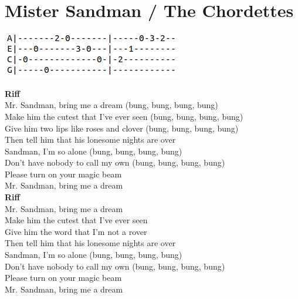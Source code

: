 \section{Mister Sandman / The Chordettes}\label{sec:mistersandman}
\includegraphics{songs/m/mistersandmantab.png}

\CmajorSeven
\Bseven
\Eseven
\Aseven
\Dseven
\Gseven
\Aminor
\Dminor
\Fminor

\textbf{Riff}\\
Mr. Sandman, bring me a dream (bung, bung, bung, bung)\\
Make him the cutest that  I've ever seen (bung, bung, bung, bung)\\
Give him two lips like  roses and clover (bung, bung, bung, bung)\\
Then tell him that his lonesome nights are over\\
Sandman, I'm so alone (bung, bung, bung, bung)\\
Don't have nobody to call my own (bung, bung, bung, bung)\\
Please turn on your magic beam\\
Mr. Sandman, bring me a dream\\
\textbf{Riff}\\
Mr. Sandman, bring me a dream\\
Make him the cutest that I've ever seen\\
Give him the word that I'm not a rover\\
Then tell him that his lonesome nights are over\\
Sandman, I'm so alone (bung, bung, bung, bung)\\
Don't have nobody to call my own (bung, bung, bung, bung)\\
Please turn on your magic beam\\
Mr. Sandman, bring me a dream\\
